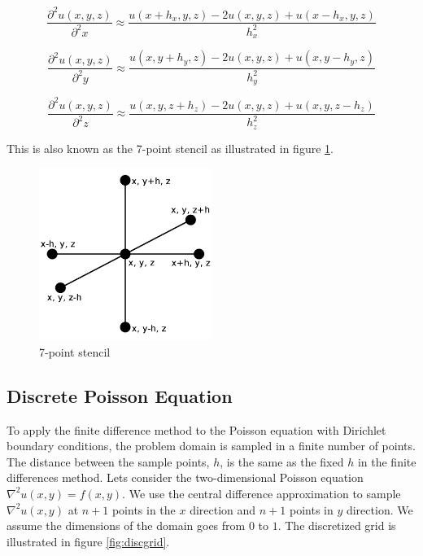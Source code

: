 $$\frac{\partial^2 u(x, y, z)}{\partial^2 x} \approx \frac{u(x+h_x, y, z) - 2u(x, y, z) + u(x-h_x, y, z)}{h_x^2}$$

$$\frac{\partial^2 u(x, y, z)}{\partial^2 y} \approx \frac{u(x, y+h_y, z) - 2u(x, y, z) + u(x, y-h_y, z)}{h_y^2}$$

$$\frac{\partial^2 u(x, y, z)}{\partial^2 z} \approx \frac{u(x, y, z+h_z) - 2u(x, y, z) + u(x, y, z-h_z)}{h_z^2}$$

This is also known as the 7-point stencil as illustrated in figure \ref{fig:7ps}.

\begin{figure}[ht]
	\center
	\includegraphics[width=0.5\textwidth]{images/7_point_stencil}
	\caption{7-point stencil}
	\label{fig:7ps}
\end{figure}

\subsection{Discrete Poisson Equation}

To apply the finite difference method to the Poisson equation with Dirichlet 
boundary conditions, the problem domain is sampled in a finite number of points. 
The distance between the sample points, $h$, is the same as the fixed $h$ in the finite
differences method. Lets consider the two-dimensional Poisson equation $\nabla^2
u(x, y) = f(x, y)$. We use the central difference approximation to sample
$\nabla^2 u(x, y)$ at $n+1$ points in the $x$ direction and $n+1$ points in $y$
direction. We assume the dimensions of the domain goes from $0$ to $1$. The discretized 
grid is illustrated in figure \ref{fig:discgrid}.

